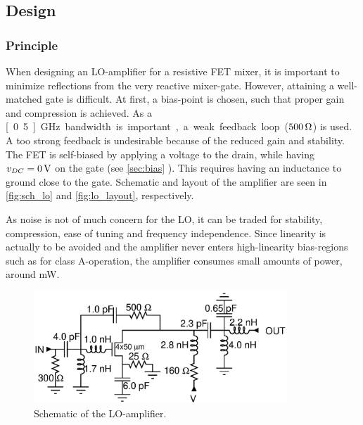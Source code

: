 		\subsection{Design}
			\subsubsection{Principle}
				When designing an LO-amplifier for a resistive FET mixer, it is important to minimize reflections from the very reactive mixer-gate. However, attaining a well-matched gate is difficult.\autocite{yhland1999} At first, a bias-point is chosen, such that proper gain and compression is achieved. As a \unit[0.5]{GHz} bandwidth is important, a weak feedback loop ($\unit[500]{\Omega}$) is used. A too strong feedback is undesirable because of the reduced gain and stability. The FET is self-biased by applying a voltage to the drain, while having $v_{DC}=\unit[0]{V}$ on the gate (see \ref{sec:bias} ). This requires having an inductance to ground close to the gate. Schematic and layout of the amplifier are seen in \autoref{fig:sch_lo} and \autoref{fig:lo_layout}, respectively.



				As noise is not of much concern for the LO, it can be traded for stability, compression, ease of tuning and frequency independence. Since linearity is actually to be avoided and the amplifier never enters high-linearity bias-regions such as for class A-operation, the amplifier consumes small amounts of power, around \unit[100]{mW}.




			\begin{figure}[hbt!]
				\centering
				\includegraphics[width=0.85\textwidth]{fig/amplifiers/lo/sch_lo}
				\caption[LO-amplifier schematic]{Schematic of the LO-amplifier.}\label{fig:sch_lo}
			\end{figure}


